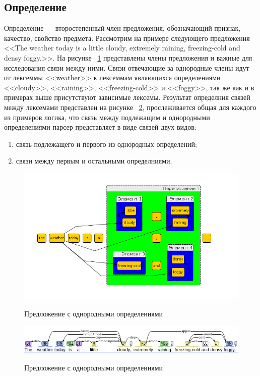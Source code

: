 \documentclass{standalone}
\begin{document}
\subsection{Определение} %
\par Определение — второстепенный член предложения, обозначающий признак, качество, свойство предмета. Рассмотрим на примере следующего предложения <<The weather today is a little cloudy, extremely raining, freezing-cold and densy foggy.>>. На рисунке ~\ref{opredelenie} представлены члены предложения и важные для исследования связи между ними. Связи отвечающие за однородные члены идут от лексеммы <<weather>> к лексеммам являющихся определениями <<cloudy>>, <<raining>>, <<freezing-cold>> и <<foggy>>, так же как и в примерах выше присутствуют зависимые лексемы. Результат определния связей между лексемами представлен на рисунке ~\ref{opredelenie2}, прослеживается общая для каждого из примеров логика, что связь между подлежащим и однородными определениями парсер представляет в виде связей двух видов: 
\begin{enumerate}
    \item связь подлежащего и первого из однородных определений;
    \item связи между первым и остальными определниями.
\end{enumerate}

\begin{figure}[!ht]
\includegraphics[width=\textwidth]{images/sentences7.png}
\label{opredelenie}
\caption{Предложение с однородными определениями}
\end{figure}
\begin{figure}[!ht]
\includegraphics[width=\textwidth]{images/sentences71.png}
\label{opredelenie2}
\caption{Предложение с однородными определениями}
\end{figure}
\end{document}
